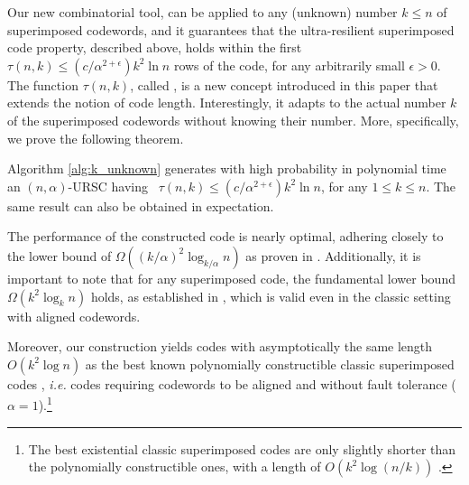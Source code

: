 \documentclass[11pt]{article}
\begin{document}
Our new combinatorial tool, can be applied to any (unknown) number $k\le n$ of superimposed codewords, 
and it guarantees that the ultra-resilient superimposed code property, 
described above, holds within the first $\tau(n,k) \le (c/\alpha^{2+\epsilon}) k^2 \ln n$ 
rows of the code, for any arbitrarily small $\epsilon > 0$. 
The function $\tau(n,k)$, called \elongation, is a new concept introduced in this paper that extends the
notion of code length. Interestingly, it adapts to the actual number $k$ of the superimposed 
codewords without knowing their number. More, specifically, we prove the following theorem.

\begin{theorem}
Algorithm \ref{alg:k_unknown} generates with high probability in polynomial time 
an $(n,\alpha)$-URSC having \elongation\ 
$\tau(n,k) \le (c/\alpha^{2+\epsilon}) k^2 \ln n$, for any $1\le k \le n$. 
The same result can also be obtained in expectation.
\end{theorem}

The performance of the constructed code is nearly optimal, adhering closely to the lower bound of 
$\Omega\left(\left({k}/{\alpha}\right)^2 \log_{{k}/{\alpha}} n\right)$ as proven in \cite{RescignoV24}.
Additionally, it is important to note that for any superimposed code, the fundamental lower bound 
$\Omega(k^2 \log_k n)$ holds, as established in \cite{Dyachkov1982,Furedi1996,Ruszinko1994}, 
which is valid even in the classic setting with aligned codewords. 

Moreover, our construction yields codes with asymptotically the same length 
$O(k^2 \log n)$ as the best known polynomially constructible classic superimposed codes \cite{PR11},
\textit{i.e.} codes requiring codewords to be aligned and without fault tolerance ($\alpha = 1$).\footnote{The best existential classic superimposed codes are only slightly shorter than the polynomially constructible ones, 
with a length of \(O(k^2 \log(n/k))\) \cite{ErdosFF82}.}
\fi


\iffalse
\dk{[[[THIS PARAGRAPH DOES NOT FIT WITHIN TECHNICAL NOVELTY - I SUGGEST TO SHORTEN IT AND INCORPORATE INTO OUR RESULTS]]]}
To the best of our knowledge, ours is the first (and efficient) construction of a much more general
superimposed code 
\dk{guarantying shift and flip resiliency and better codeword isolation}
without requiring knowledge of 
$k$. Surprisingly, as we will discuss shortly, our codes achieve the same performance as the best 
polynomially constructible classic superimposed codes (for fixed codewords) and come very close 
to the fundamental lower bound, also established in the classic setting with fixed codewords.
\fi
\end{document}
